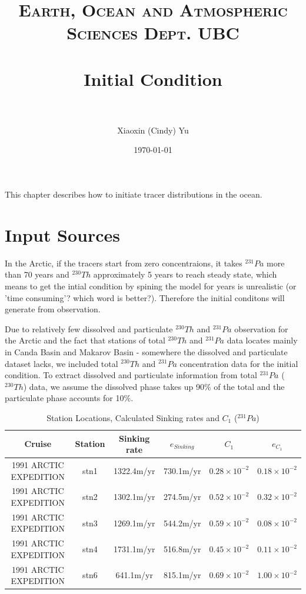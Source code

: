 \documentclass[paper=a4, fontsize=11pt]{scrartcl} %
\title{   
\normalfont \normalsize
\textsc{Earth, Ocean and Atmospheric Sciences Dept. UBC} \\ [25pt] %
\horrule{0.5pt} \\[0.4cm] %
\huge Initial Condition \\ %
\horrule{2pt} \\[0.5cm] %
}
\author{Xiaoxin (Cindy) Yu} %
\date{\normalsize\today} %
\numberwithin{equation}{section} %
\numberwithin{figure}{section} %
\numberwithin{table}{section} %
\begin{document}
\maketitle %

This chapter describes how to initiate tracer distributions in the ocean. 
\section{Input Sources}
In the Arctic, if the tracers start from zero concentraions, it takes $^{231}Pa$ more than 70 years and $^{230}Th$ approximately 5 years to reach steady state, which means to get the intial condition by spining the model for years is unrealistic (or 'time consuming'? which word is better?). Therefore the initial conditons will generate from observation.  

Due to relatively few dissolved and particulate $^{230}Th$ and $^{231}Pa$ observation for the Arctic and the fact that stations of total $^{230}Th$ and $^{231}Pa$ data locates mainly in Canda Basin and Makarov Basin - somewhere the dissolved and particulate dataset lacks, we included total $^{230}Th$ and $^{231}Pa$ concentration data for the initial condition. To extract dissolved and particulate information from total $^{231}Pa$ ($^{230}Th$) data, we assume the dissolved phase takes up 90$\%$ of the total and the particulate phase accounts for 10$\%$. 

\begin{table}[!h]
\caption{Station Locations, Calculated Sinking rates and $C_{1}$ ($^{231}Pa$) }%
\centering
\begin{tabular}{ |c|c|c|c|c|c|}
\hline
 Cruise &Station&Sinking rate&$e_{Sinking}$&$C_{1}$&$e_{C_{1}}$\\
\hline
 1991 ARCTIC EXPEDITION&stn1&1322.4m/yr&730.1m/yr&$0.28\times10^{-2}$&$0.18\times10^{-2}$\\
 1991 ARCTIC EXPEDITION&stn2&1302.1m/yr&274.5m/yr&$0.52\times10^{-2}$&$0.32\times10^{-2}$\\
 1991 ARCTIC EXPEDITION&stn3&1269.1m/yr&544.2m/yr&$0.59\times10^{-2}$&$0.08\times10^{-2}$\\
 1991 ARCTIC EXPEDITION&stn4&1731.1m/yr&516.8m/yr&$0.45\times10^{-2}$&$0.11\times10^{-2}$\\
 1991 ARCTIC EXPEDITION&stn6&641.1m/yr&815.1m/yr&$0.69\times10^{-2}$&$1.00\times10^{-2}$\\
\hline
\end{tabular}
\label{tab:2}
\end{table}
\end{document}
